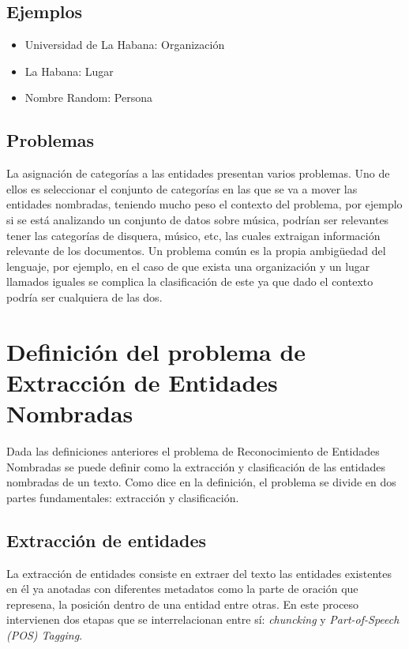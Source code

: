 \documentclass[runningheads]{llncs}
\begin{document}
\subsection{Ejemplos}

\begin{itemize}

\item Universidad de La Habana: Organización
\item La Habana: Lugar
\item Nombre Random: Persona %

\end{itemize}

\subsection{Problemas}

La asignación de categorías a las entidades presentan varios problemas. Uno de ellos es seleccionar el conjunto de categorías en las que se va a mover las entidades nombradas, teniendo mucho peso el contexto del problema, por ejemplo si se está analizando un conjunto de datos sobre música, podrían ser relevantes tener las categorías de disquera, músico, etc, las cuales extraigan información relevante de los documentos. Un problema común es la propia ambigüedad del lenguaje, por ejemplo, en el caso de que exista una organización y un lugar llamados iguales se complica la clasificación de este ya que dado el contexto podría ser cualquiera de las dos. %

\section{Definición del problema de Extracción de Entidades Nombradas}

Dada las definiciones anteriores el problema de Reconocimiento de Entidades Nombradas se puede definir como la extracción y clasificación de las entidades nombradas de un texto. Como dice en la definición, el problema se divide en dos partes fundamentales: extracción y clasificación.

\subsection{Extracción de entidades}

La extracción de entidades consiste en extraer del texto las entidades existentes en él ya anotadas con diferentes metadatos como la parte de oración que represena, la posición dentro de una entidad entre otras. En este proceso intervienen dos etapas que se interrelacionan entre sí: \emph{chuncking}\cite{chunking} y \emph{Part-of-Speech (POS) Tagging}\cite{postag}.
\end{document}

